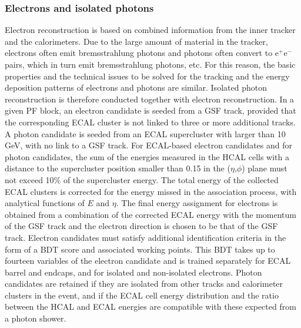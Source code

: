\subsubsection{Electrons and isolated photons} Electron reconstruction is based on combined information from the inner tracker and the calorimeters. Due to the large amount of material in the tracker, electrons often emit bremsstrahlung photons and photons often convert to e$^+$e$^-$ pairs, which in turn emit bremsstrahlung photons, etc.  For this reason, the basic properties and the technical issues to be solved for the tracking and the energy deposition patterns of electrons and photons are similar. Isolated photon reconstruction is therefore conducted together with electron reconstruction. In a given PF block, an electron candidate is seeded from a GSF track, provided that the corresponding ECAL cluster is not linked to three or more additional tracks. A photon candidate is seeded from an ECAL supercluster with \et larger than 10 GeV, with no link to a GSF track. For ECAL-based electron candidates and for photon candidates, the sum of the energies measured in the HCAL cells with a distance to the supercluster position smaller than 0.15 in the ($\eta$,$\phi$) plane must not exceed 10$\%$ of the supercluster energy. The total energy of the collected ECAL clusters is corrected for the energy missed in the association process, with analytical functions of $E$ and $\eta$. The final energy assignment for electrons is obtained from a combination of the corrected ECAL energy with the momentum of the GSF track and the electron direction is chosen to be that of the GSF track. Electron candidates must satisfy additional identification criteria in the form of a BDT score and associated working points. This BDT takes up to fourteen variables of the electron candidate and is trained separately for ECAL barrel and endcaps, and for isolated and non-isolated electrons. Photon candidates are retained if they are isolated from other tracks and calorimeter clusters in the event, and if the ECAL cell energy distribution and the ratio between the HCAL and ECAL energies are compatible with these expected from a photon shower. 

